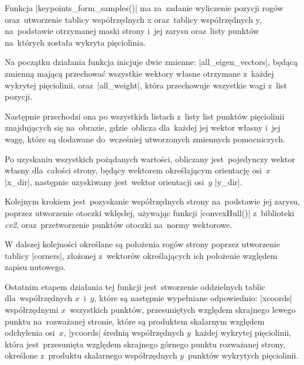 Funkcja \pyth|keypoints_form_samples()| ma za~zadanie wyliczenie pozycji rogów oraz~utworzenie tablicy współrzędnych x oraz~tablicy współrzędnych y, na~podstawie otrzymanej maski strony \linebreak i~jej zarysu oraz~listy punktów na~których została wykryta pięciolinia.

Na początku działania funkcja inicjuje dwie zmienne: \pyth|all_eigen_vectors|, będącą zmienną \linebreak mającą przechować wszystkie wektory własne otrzymane z~każdej wykrytej pięciolinii, \linebreak oraz~\pyth|all_weight|, która przechowuje wszystkie wagi z~list pozycji.

Następnie przechodzi ona po wszystkich listach z~listy list punktów pięciolinii znajdujących się na~obrazie, gdzie~oblicza dla~każdej jej wektor własny i~jej wagę, które są dodawane do~wcześniej utworzonych zmiennych pomocniczych.

Po uzyskaniu wszystkich pożądanych wartości, obliczany jest~pojedynczy wektor własny \linebreak dla~całości strony, będący wektorem określającym orientację osi~$x$ \pyth|x_dir|, następnie uzyskiwany jest~wektor orientacji osi~$y$ \pyth|y_dir|.

Kolejnym krokiem jest~pozyskanie współrzędnych strony na~podstawie jej zarysu, poprzez \linebreak utworzenie otoczki wklęsłej, używając funkcji \pyth|convexHull()| z~biblioteki \textit{cv2}, oraz~przetworzenie punktów otoczki na~normy wektorowe.

W dalszej kolejności określane są położenia rogów strony poprzez utworzenie tablicy \pyth|corners|, złożonej z~wektorów określających ich położenie względem zapisu nutowego.

Ostatnim etapem działania tej funkcji jest~stworzenie oddzielnych tablic dla~współrzędnych $x$~i~$y$, które są następnie wypełniane odpowiednio: \pyth|xcoords| współrzędnymi $x$~wszystkich punktów, \linebreak przesuniętych względem skrajnego lewego punktu na~rozważanej stronie, które są produktem \linebreak skalarnym względem odchylenia osi~$x$, \pyth|ycoords| średnią współrzędnych $y$~każdej wykrytej pięciolinii, która jest~przesunięta względem skrajnego górnego punktu rozważanej strony, określone z~produktu skalarnego współrzędnych $y$~punktów wykrytych pięciolinii. 

